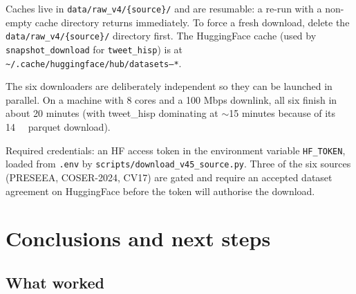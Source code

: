 \documentclass[11pt,a4paper]{article}
\begin{document}
Caches live in \texttt{data/raw\_v4/\{source\}/} and are resumable: a
re-run with a non-empty cache directory returns immediately. To force a
fresh download, delete the \texttt{data/raw\_v4/\{source\}/} directory
first. The HuggingFace cache (used by \texttt{snapshot\_download} for
\texttt{tweet\_hisp}) is at
\texttt{\textasciitilde/.cache/huggingface/hub/datasets--*}.

The six downloaders are deliberately independent so they can be launched
in parallel. On a machine with 8 cores and a 100 Mbps downlink, all six
finish in about 20 minutes (with tweet\_hisp dominating at
$\sim$15 minutes because of its \SI{14}{\giga\byte} parquet download).

Required credentials: an HF access token in the environment variable
\texttt{HF\_TOKEN}, loaded from \texttt{.env} by
\texttt{scripts/download\_v45\_source.py}. Three of the six sources
(PRESEEA, COSER-2024, CV17) are gated and require an accepted dataset
agreement on HuggingFace before the token will authorise the download.

\section{Conclusions and next steps}

\subsection{What worked}
\end{document}
